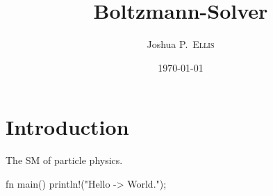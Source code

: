 \documentclass[
  a4paper,             %
  11pt,                %
  oneside,             %
  onecolumn,           %
  bibliography=totoc,  %
  final,               %
]{scrartcl}
\title{Boltzmann-Solver}
\author{Joshua P.~\textsc{Ellis}}
\date{\today}
\makeatletter
\newcommand\@degreetitle{}
\newcommand\@department{}
\newcommand\@university{}
\makeatother
\begin{document}

\pagestyle{empty}









\cleardoublepage
{}
\pagestyle{plain}

\tableofcontents

\cleardoublepage
\pagestyle{headings}

\section{Introduction}
\label{sec:introduction}

The \gls{SM} of particle physics.


\begin{rustcode}
  fn main() {
      println!("Hello -> World.");
  }
\end{rustcode}

\cleardoublepage
\appendix
{}
\pagestyle{plain}

\printglossaries

\cleardoublepage
\pagestyle{plain}
\printbibliography
\end{document}
